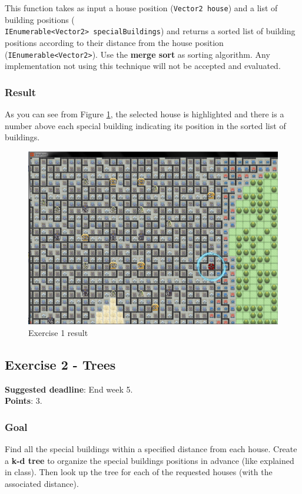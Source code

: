 This function takes as input a house position (\texttt{Vector2 house}) and a list of building positions (\\ \texttt{IEnumerable<Vector2> specialBuildings}) and returns a sorted list of building positions according to their distance from the house position (\texttt{IEnumerable<Vector2>}). Use the \textbf{merge sort} as sorting algorithm. Any implementation not using this technique will not be accepted and evaluated.\\

\subsubsection*{Result}
As you can see from Figure \ref{img:Ex1}, the selected house is highlighted and there is a number above each special building indicating its position in the sorted list of buildings. 

\begin{figure}[!h]
\centering
\includegraphics[scale=0.25]{img/exercise1}
\caption{Exercise 1 result}
\label{img:Ex1}
\end{figure}

\newpage
\subsection*{Exercise 2 - Trees}
\textbf{Suggested deadline}: End week 5. \\
\textbf{Points}: 3.

\subsubsection*{Goal}
Find all the special buildings within a specified distance from each house. Create a \textbf{k-d tree} to organize the special buildings positions in advance (like explained in class). Then look up the tree for each of the requested houses (with the associated distance).

